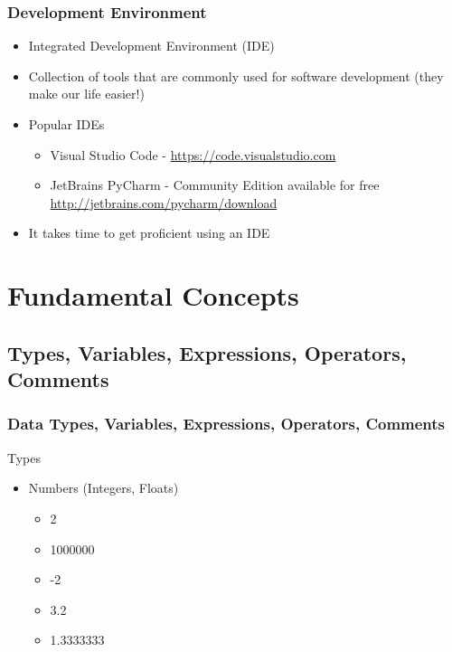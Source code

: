 \documentclass[10pt, a4paper]{beamer} %
\begin{document}
\begin{frame}[c]\frametitle{Development Environment}

  \begin{itemize}
    \item Integrated Development Environment (IDE)
    \item Collection of tools that are commonly used for software development (they make our life easier!)
    \item Popular IDEs
          \begin{itemize}
            \item Visual Studio Code - \url{https://code.visualstudio.com}
            \item JetBrains PyCharm - Community Edition available for free \url{http://jetbrains.com/pycharm/download}
          \end{itemize}
    \item It takes time to get proficient using an IDE
  \end{itemize}
\end{frame}


\section{Fundamental Concepts} %
\label{sec:fundamental_concepts}

\subsection{Types, Variables, Expressions, Operators, Comments} %
\label{sub:Types_variables_expressions_operators_comments}

\begin{frame}[c]\frametitle{Data Types, Variables, Expressions, Operators, Comments}
  \begin{block}{Types}
    \begin{itemize}
      \item Numbers (Integers, Floats)
            \begin{itemize}
              \item 2
              \item 1000000
              \item -2
              \item 3.2
              \item 1.3333333
            \end{itemize}
    \end{itemize}
  \end{block}

\end{frame}
\end{document}

